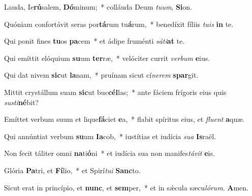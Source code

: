 \item Lauda, Ie\textbf{rú}salem, \textbf{Dó}minum;~* colláuda Deum \textit{tuum}, \textbf{Si}on.

\item Quóniam confortávit seras por\textbf{tá}rum tu\textbf{á}rum,~* benedíxit fíliis \textit{tuis} \textbf{in} te.

\item Qui ponit fines \textbf{tu}os \textbf{pa}cem~* et ádipe fruménti \textit{sáti}\textbf{at} te.

\item Qui emíttit elóquium \textbf{su}um \textbf{ter}ræ,~* velóciter currit \textit{verbum} \textbf{e}ius.

\item Qui dat nivem \textbf{sic}ut \textbf{la}nam,~* pruínam sicut cí\textit{nerem} \textbf{spar}git.

\item Mittit crystállum suam \textbf{sic}ut buc\textbf{cél}las;~* ante fáciem frígoris eius quis \textit{susti}\textbf{né}bit?

\item Emíttet verbum suum et lique\textbf{fá}ciet \textbf{e}a,~* flabit spíritus eius, et \textit{fluent} \textbf{a}quæ.

\item Qui annúntiat verbum \textbf{su}um \textbf{Ia}cob,~* iustítias et iudícia \textit{sua} \textbf{Is}raël.

\item Non fecit táliter omni \textbf{na}ti\textbf{ó}ni~* et iudícia sua non manifes\textit{távit} \textbf{e}is.

\item Glória \textbf{Pa}tri, et \textbf{Fí}lio,~* et Spirí\textit{tui} \textbf{Sanc}to.

\item Sicut erat in princípio, et \textbf{nunc}, et \textbf{sem}per,~* et in sǽcula sæcu\textit{lórum}. \textbf{A}men.
